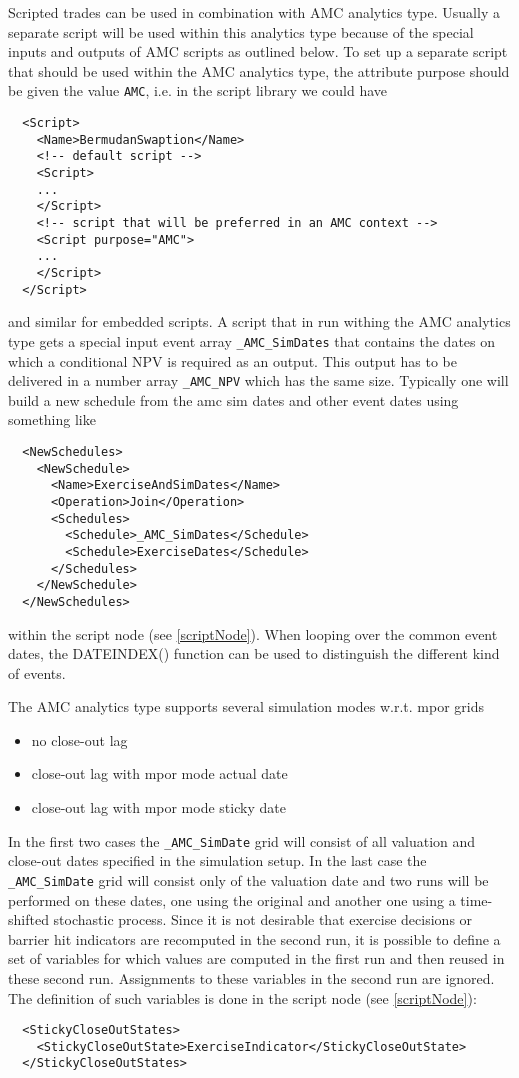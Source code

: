 Scripted trades can be used in combination with AMC analytics type. Usually a separate script will be used within this
analytics type because of the special inputs and outputs of AMC scripts as outlined below. To set up a separate script
that should be used within the AMC analytics type, the attribute purpose should be given the value \verb+AMC+, i.e. in
the script library we could have

\begin{verbatim}
  <Script>
    <Name>BermudanSwaption</Name>
    <!-- default script -->
    <Script>
    ...
    </Script>
    <!-- script that will be preferred in an AMC context -->
    <Script purpose="AMC">
    ...
    </Script>
  </Script>
\end{verbatim}

and similar for embedded scripts. A script that in run withing the AMC analytics type gets a special input event array
\verb+_AMC_SimDates+ that contains the dates on which a conditional NPV is required as an output. This output has to be
delivered in a number array \verb+_AMC_NPV+ which has the same size. Typically one will build a new schedule from the
amc sim dates and other event dates using something like

\begin{verbatim}
  <NewSchedules>
    <NewSchedule>
      <Name>ExerciseAndSimDates</Name>
      <Operation>Join</Operation>
      <Schedules>
        <Schedule>_AMC_SimDates</Schedule>
        <Schedule>ExerciseDates</Schedule>
      </Schedules>
    </NewSchedule>
  </NewSchedules>
\end{verbatim}

within the script node (see \ref{scriptNode}). When looping over the common event dates, the DATEINDEX() function can be
used to distinguish the different kind of events.

The AMC analytics type supports several simulation modes w.r.t. mpor grids

\begin{itemize}
\item no close-out lag
\item close-out lag with mpor mode actual date
\item close-out lag with mpor mode sticky date
\end{itemize}

In the first two cases the \verb+_AMC_SimDate+ grid will consist of all valuation and close-out dates specified in the
simulation setup. In the last case the \verb+_AMC_SimDate+ grid will consist only of the valuation date and two runs
will be performed on these dates, one using the original and another one using a time-shifted stochastic process. Since
it is not desirable that exercise decisions or barrier hit indicators are recomputed in the second run, it is possible
to define a set of variables for which values are computed in the first run and then reused in these second
run. Assignments to these variables in the second run are ignored. The definition of such variables is done in the
script node (see \ref{scriptNode}):

\begin{verbatim}
  <StickyCloseOutStates>
    <StickyCloseOutState>ExerciseIndicator</StickyCloseOutState>
  </StickyCloseOutStates>
\end{verbatim}